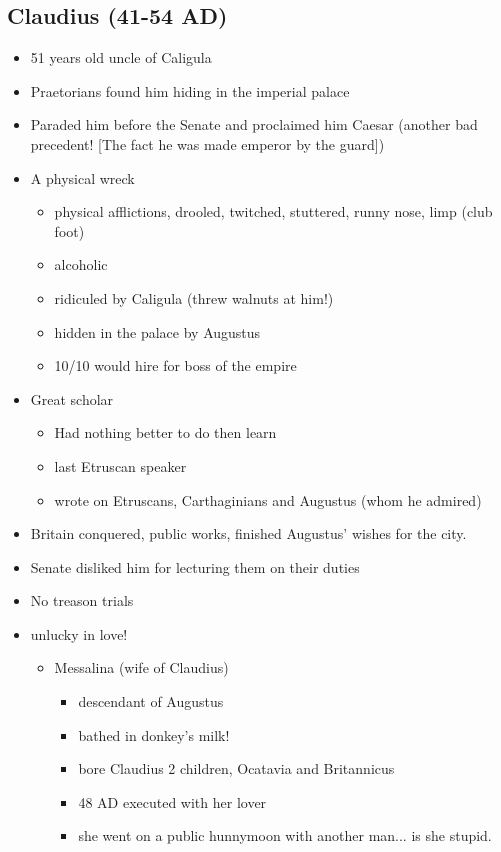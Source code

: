 \documentclass[12pt, twoside]{article}
\begin{document}
\subsection{Claudius (41-54 AD)}
\begin{itemize}
\item 51 years old uncle of Caligula
\item Praetorians found him hiding in the imperial palace
\item Paraded him before the Senate and proclaimed him Caesar (another bad precedent! [The fact he was made emperor by the guard])
\item A physical wreck
	\begin{itemize}
	\item physical afflictions, drooled, twitched, stuttered, runny nose, limp (club foot)
	\item alcoholic
	\item ridiculed by Caligula (threw walnuts at him!)
	\item hidden in the palace by Augustus
	\item 10/10 would hire for boss of the empire
	\end{itemize}
\item Great scholar
	\begin{itemize}
	\item Had nothing better to do then learn
	\item last Etruscan speaker
	\item wrote on Etruscans, Carthaginians and Augustus (whom he admired)
	\end{itemize}
\item Britain conquered, public works, finished Augustus' wishes for the city.
\item Senate disliked him for lecturing them on their duties
\item No treason trials
\item unlucky in love!
	\begin{itemize}
	\item Messalina (wife of Claudius)
		\begin{itemize}
		\item descendant of Augustus
		\item bathed in donkey’s milk!
		\item bore Claudius 2 children, Ocatavia and Britannicus
		\item 48 AD executed with her lover
		\item she went on a public hunnymoon with another man... is she stupid.

\end{itemize}
\end{itemize}
\end{itemize}
\end{document}

